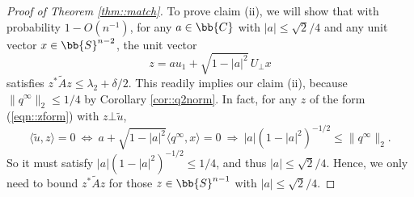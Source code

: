 \documentclass[12pt]{article}%
\theoremstyle{plain}%
\theoremstyle{remark}
\begin{document}
\begin{proof}[Proof of Theorem \ref{thm::match}]
%

To prove claim (ii), we will show that with probability $1 - O(n^{-1})$, for any $a \in \bb{C}$ with $|a| \le \sqrt{2}/4$ and any unit vector $x \in \bb{S}^{n-2}$, the unit vector 
\begin{equation}\label{eqn::zform}
z = au_1 + \sqrt{ 1 - |a|^2 }\, U_\bot x
\end{equation}
satisfies $z^* \tilde{A} z \le \lambda_2 + \delta/2$. This readily implies our claim (ii), because $\|q^\infty \|_2 \le 1/4$ by Corollary \ref{cor::q2norm}. In fact, for any $z$ of the form (\ref{eqn::zform}) with $z \bot \tilde{u}$,
\begin{equation*}
\langle \tilde{u}, z \rangle = 0 ~ \Leftrightarrow ~ a + \sqrt{1 - |a|^2} \langle q^\infty, x \rangle = 0  ~ \Rightarrow  ~ |a| (1 - |a|^2)^{-1/2} \le \|q^\infty \|_2.
\end{equation*}
So it must satisfy $|a| (1 - |a|^2)^{-1/2} \le 1/4$, and thus $|a| \le \sqrt{2}/4$. Hence, we only need to bound $z^* \tilde{A} z$ for those $z \in \bb{S}^{n-1}$ with $|a| \le \sqrt{2}/4$. 


\end{proof}
\end{document}
